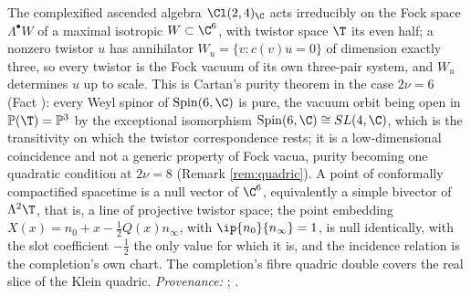 The complexified ascended algebra $\Cl(2,4)_{\C}$ acts irreducibly on the Fock space $\Lambda^{\bullet}W$ of a maximal isotropic $W \subset \C^{6}$, with twistor space $\T$ its even half; a nonzero twistor $u$ has annihilator $W_{u} = \{v : c(v)u = 0\}$ of dimension exactly three, so every twistor is the Fock vacuum of its own three-pair system, and $W_{u}$ determines $u$ up to scale. This is Cartan's purity theorem in the case $2\nu = 6$ (Fact ): every Weyl spinor of $\mathrm{Spin}(6, \C)$ is pure, the vacuum orbit being open in $\mathbb{P}(\T) = \mathbb{P}^{3}$ by the exceptional isomorphism $\mathrm{Spin}(6, \C) \cong SL(4, \C)$, which is the transitivity on which the twistor correspondence rests; it is a low-dimensional coincidence and not a generic property of Fock vacua, purity becoming one quadratic condition at $2\nu = 8$ (Remark \ref{rem:quadric}). A point of conformally compactified spacetime is a null vector of $\C^{6}$, equivalently a simple bivector of $\Lambda^{2}\T$, that is, a line of projective twistor space; the point embedding $X(x) = n_{0} + x - \tfrac12 Q(x)n_{\infty}$, with $\ip{n_{0}}{n_{\infty}} = 1$, is null identically, with the slot coefficient $-\tfrac12$ the only value for which it is, and the incidence relation is the completion's own chart. The completion's fibre quadric double covers the real slice of the Klein quadric. \emph{Provenance:} \cite[Thm.~3.1, Thm.~3.4, Thm.~4.2, Thm.~5.3]{ButlerT9}; \cite[Fact~2.3, Rem.~5.2]{ButlerT11}.
